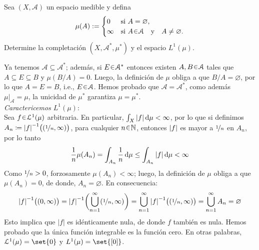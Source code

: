 \setcounter{neje}{64}
\begin{nejer}
Sea $(X, \mathcal{A})$ un espacio medible y defina
$$
\mu(A) := \begin{cases} 
0 & \text{si } A = \varnothing, \\
\infty & \text{si } A \en \mathcal{A} \quad\text{y}\quad A \neq \varnothing.
\end{cases}
$$
Determine la completación $(X, \mathcal{A}^*, \mu^*)$ y el espacio $L^1(\mu)$.
\end{nejer}
\begin{sol}
Ya tenemos $\mathcal{A} \subseteq \mathcal{A}^*$; además, si $E\en\mathcal{A}^*$ entonces existen $A,B\en\mathcal{A}$ tales que $A \subseteq E \subseteq B$ y $\mu(B/A) = 0$. Luego, la definición de $\mu$ obliga a que $B/A = \varnothing$, por lo que $A=E=B$, i.e., $E\en \mathcal{A}$. Hemos probado que $\mathcal{A}=\mathcal{A}^*$, como además $\mu|_\mathcal{A} = \mu$, la unicidad de $\mu^*$ garantiza $\mu = \mu^*$.\vspace{1em}\\
\emph{Caractericemos $L^1(\mu)$}:\\
Sea $f\en\mathcal{L}^1(\mu)$ arbitraria. En particular, $\int_X\abs{f} \dd{\mu} < \infty$, por lo que si definimos $A_n \coloneq \abs{f}^{-1}\bigl((\nicefrac{1}{n},\infty)\bigr)$, para cualquier $n\en\mathbb{N}$, entonces $\abs{f}$ es mayor a $\nicefrac{1}{n}$ en $A_n$, por lo tanto 
\[
\frac{1}{n}\mu(A_n)
= \int_{A_n}\frac{1}{n} \dd{\mu}
\leq \int_{A_n}\abs{f} \dd{\mu}
< \infty
\]
Como $\nicefrac{1}{n} > 0$, forzosamente $\mu(A_n) < \infty$; luego, la definición de $\mu$ obliga a que $\mu(A_n) = 0$, de donde, $A_n = \varnothing$. En consecuencia:
\[
\abs{f}^{-1}\bigl((0,\infty)\bigr) 
= \abs{f}^{-1}\biggl(\bigcup^\infty_{n=1}(\nicefrac{1}{n},\infty)\biggr)
= \bigcup^\infty_{n=1}\abs{f}^{-1}\bigl((\nicefrac{1}{n},\infty)\bigr)
= \bigcup^\infty_{n=1}A_n = \varnothing
\]
Esto implica que $|f|$ es idénticamente nula, de donde $f$ también es nula. Hemos probado que la única función integrable es la función cero. En otras palabras, $\mathcal{L}^1(\mu) = \set{0}$ y $L^1(\mu) = \set{[0]}$.
\end{sol}